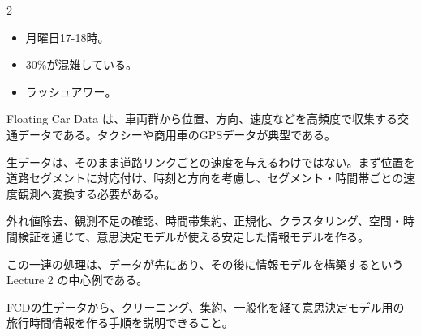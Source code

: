 \begin{multicols}{2}

\footnotesize

\raggedcolumns


\begin{itemize}
\item 月曜日17-18時。
\item 30\%が混雑している。
\item ラッシュアワー。
\end{itemize}

Floating Car Data は、車両群から位置、方向、速度などを高頻度で収集する交通データである。タクシーや商用車のGPSデータが典型である。\par

生データは、そのまま道路リンクごとの速度を与えるわけではない。まず位置を道路セグメントに対応付け、時刻と方向を考慮し、セグメント・時間帯ごとの速度観測へ変換する必要がある。\par

外れ値除去、観測不足の確認、時間帯集約、正規化、クラスタリング、空間・時間検証を通じて、意思決定モデルが使える安定した情報モデルを作る。\par

この一連の処理は、データが先にあり、その後に情報モデルを構築するという Lecture 2 の中心例である。\par

FCDの生データから、クリーニング、集約、一般化を経て意思決定モデル用の旅行時間情報を作る手順を説明できること。\par



\end{multicols}
